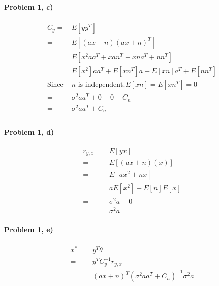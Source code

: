 \documentclass[11pt]{article}
\begin{document}
\paragraph{\noindent\textbf{\LARGE{Problem 1, c)}}}  
\begin{equation*}
\begin{split}
    C_y = & E[yy^T] \\
        = & E[(ax+n)(ax+n)^T] \\
        = & E[x^2aa^T + xan^T + xna^T + nn^T] \\
        = & E[x^2]aa^T + E[xn^T]a + E[xn]a^T + E[nn^T] \\
    \text{Since } &  n \text{ is independent}. E[xn] = E[xn^T] = 0\\
        = & \sigma^2 aa^T + 0 + 0 + C_n \\
        = & \sigma^2 aa^T  + C_n \\
\end{split}
\end{equation*}

\paragraph{\noindent\textbf{\LARGE{Problem 1, d)}}}  
\begin{equation*}
\begin{split}
    r_{y,x} = & E[yx] \\
        = & E[(ax+n)(x)] \\
        = & E[ax^2 + nx] \\
        = & aE[x^2] + E[n]E[x] \\
        = & \sigma^2 a + 0 \\
        = & \sigma^2 a 
\end{split}
\end{equation*}

\paragraph{\noindent\textbf{\LARGE{Problem 1, e)}}}  
\begin{equation*}
\begin{split}
    x^* = & y^T\theta \\
        = & y^T C_y^{-1} r_{y,x}  \\
        = & (ax + n)^T (\sigma^2 aa^T  + C_n)^{-1} \sigma^2 a 
\end{split}
\end{equation*}
\end{document}
